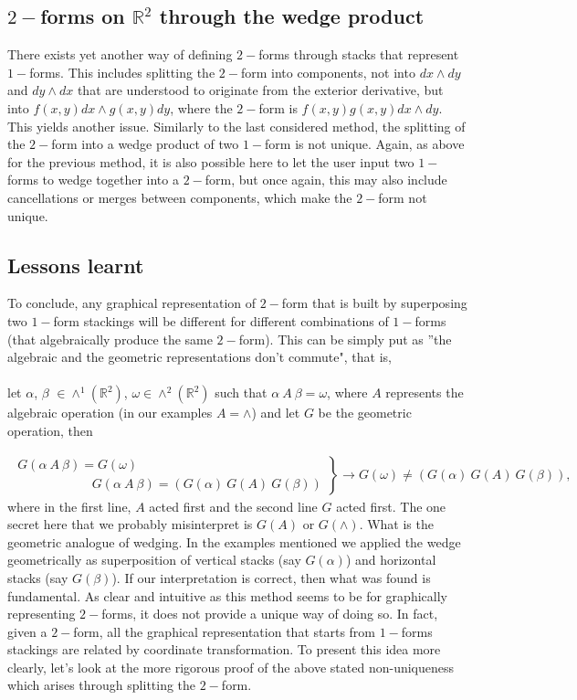 \documentclass[12pt]{report}
\begin{document}
\subsection{$2-$forms on $\mathbb{R}^2$ through the wedge product}
There exists yet another way of defining $2-$forms through stacks that represent $1-$forms. This includes splitting the $2-$form into components, not into $dx\wedge dy$ and $dy\wedge dx$ that are understood to originate from the exterior derivative, but into $f(x, y)dx \wedge g(x, y)dy$, where the $2-$form is $f(x,y)g(x,y) dx\wedge dy$. This yields another issue. Similarly to the last considered method, the splitting of the $2-$form into a wedge product of two $1-$form is not unique. Again, as above for the previous method, it is also possible here to let the user input two $1-$forms to wedge together into a $2-$form, but once again, this may also include cancellations or merges between components, which make the $2-$form not unique.

\subsection{Lessons learnt}
To conclude, any graphical representation of  $2-$form that is built by superposing two $1-$form stackings will be different for different combinations of $1-$forms (that algebraically produce the same $2-$form). This can be simply put as ''the algebraic and the geometric representations don't commute", that is, \\~\\
let $\alpha$, $\beta$  $\in \wedge^1(\mathbb{R}^2)$, $\omega \in \wedge^2(\mathbb{R}^2)$ such that $\alpha~A~\beta = \omega$, where $A$ represents the algebraic operation (in our examples $A=\wedge$)  and let $G$ be the geometric operation, then 

\begin{eqnarray*}
\left.
\begin{array}{c}
G(\alpha~A~\beta) = G(\omega)\\ 
\,\,\,\,\,\,\,\,\,\,\,\,\,\,\,\,\,\,\,\,\,\,\,\,\,\,\,\,\,\,\,\,\,\,\, G(\alpha~A~\beta) = (G(\alpha)~G(A)~G(\beta))
\end{array}
\right \} \to G(\omega) \ne (G(\alpha)~G(A)~G(\beta)),
\end{eqnarray*}
where in the first line, $A$ acted first and the second line $G$ acted first. The one secret here that we probably misinterpret is $G(A)$ or  $G(\wedge)$. What is the geometric analogue of wedging. In the examples mentioned we applied the wedge geometrically as superposition of vertical stacks (say $G(\alpha)$) and horizontal stacks (say $G(\beta)$). If our interpretation is correct, then what was found is fundamental. As clear and intuitive as this method seems to be for graphically representing $2-$forms, it does not provide a unique way of doing so. In fact, given a $2-$form, all the graphical representation that starts from $1-$forms stackings are related by coordinate transformation. To present this idea more clearly, let's look at the more rigorous proof of the above stated non-uniqueness which arises through splitting the $2-$form.
\end{document}
